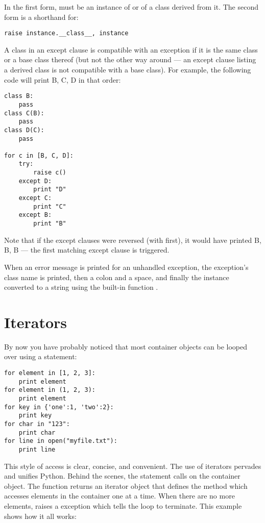 \documentclass{manual}
\begin{document}
In the first form,  must be an instance of
 or of a class derived from it.  The second form is a
shorthand for:

\begin{verbatim}
raise instance.__class__, instance
\end{verbatim}

A class in an except clause is compatible with an exception if it is the same
class or a base class thereof (but not the other way around --- an
except clause listing a derived class is not compatible with a base
class).  For example, the following code will print B, C, D in that
order:

\begin{verbatim}
class B:
    pass
class C(B):
    pass
class D(C):
    pass

for c in [B, C, D]:
    try:
        raise c()
    except D:
        print "D"
    except C:
        print "C"
    except B:
        print "B"
\end{verbatim}

Note that if the except clauses were reversed (with
 first), it would have printed B, B, B --- the first
matching except clause is triggered.

When an error message is printed for an unhandled exception, the
exception's class name is printed, then a colon and a space, and
finally the instance converted to a string using the built-in function
.


\section{Iterators\label{iterators}}

By now you have probably noticed that most container objects can be looped
over using a  statement:

\begin{verbatim}
for element in [1, 2, 3]:
    print element
for element in (1, 2, 3):
    print element
for key in {'one':1, 'two':2}:
    print key
for char in "123":
    print char
for line in open("myfile.txt"):
    print line
\end{verbatim}

This style of access is clear, concise, and convenient.  The use of iterators
pervades and unifies Python.  Behind the scenes, the 
statement calls  on the container object.  The
function returns an iterator object that defines the method
 which accesses elements in the container one at a
time.  When there are no more elements,  raises a
 exception which tells the  loop
to terminate.  This example shows how it all works:
\end{document}
